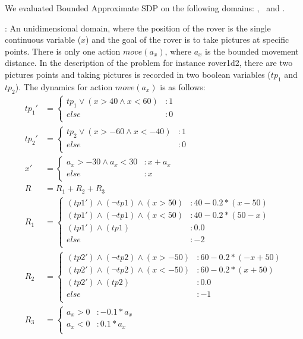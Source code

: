 We evaluated Bounded Approximate SDP on the following domains:
\MarsRoverUni, \MarsRoverBi ~and \Invent.

\MarsRoverUni:
An unidimensional domain, where the position of the rover is the single continuous variable ($x$) and the goal of the rover is to take pictures at specific points. There is only one action $ move(a_x)$, where $a_x$ is the bounded movement distance. In the description of the problem for instance rover1d2, there are two pictures points and taking pictures is recorded in two boolean variables ($tp_1$ and $tp_2$). The dynamics for action $move(a_x)$ is as follows:
{\footnotesize
\begin{align*}
tp_1' &= \begin{cases}
tp_1 \vee (x>40 \wedge x<60)&: 1\\
else&: 0\\
\end{cases}\\
tp_2' &= \begin{cases}
tp_2 \vee (x>-60 \wedge x<-40)&: 1\\
else&: 0\\
\end{cases}\\
x' &= \begin{cases}
a_x>-30 \wedge a_x<30&: x +a_x\\
else&: x\\
\end{cases}\\
R & = R_1 + R_2 + R_3\\
R_1 & = \begin{cases} 
(tp1') \wedge (\neg tp1) \wedge (x > 50) &: 40 - 0.2*(x -50)\\
(tp1') \wedge (\neg tp1) \wedge (x < 50) &: 40 - 0.2*(50-x)\\
(tp1') \wedge ( tp1) &:  0.0\\
else &: -2\\
\end{cases} \\
R_2 & = \begin{cases} 
(tp2') \wedge (\neg tp2) \wedge (x > -50) &: 60 - 0.2*(-x +50)\\
(tp2') \wedge (\neg tp2) \wedge (x < -50) &: 60 - 0.2*(x +50)\\
(tp2') \wedge ( tp2) &:  0.0\\
else &: -1\\
\end{cases} \\
R_3 & = \begin{cases} 
a_x > 0 &: -0.1*a_x\\
a_x < 0 &: 0.1*a_x\\
\end{cases} \\
\end{align*} }

